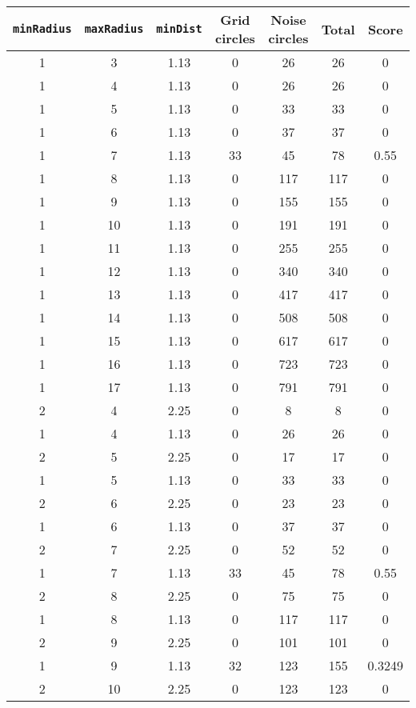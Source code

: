 \documentclass[letterpaper, 12pt]{article}
\begin{document}
\begin{longtable}{|c|c|c|c|c|c|c|}
\hline
\textbf{\texttt{minRadius}} & \textbf{\texttt{maxRadius}} & \textbf{\texttt{minDist}} & \textbf{Grid circles} & \textbf{Noise circles} & \textbf{Total} & \textbf{Score} \\
\hline
1 & 3 & 1.13 & 0 & 26 & 26 & 0 \\
\hline
1 & 4 & 1.13 & 0 & 26 & 26 & 0 \\
\hline
1 & 5 & 1.13 & 0 & 33 & 33 & 0 \\
\hline
1 & 6 & 1.13 & 0 & 37 & 37 & 0 \\
\hline
1 & 7 & 1.13 & 33 & 45 & 78 & 0.55 \\
\hline
1 & 8 & 1.13 & 0 & 117 & 117 & 0 \\
\hline
1 & 9 & 1.13 & 0 & 155 & 155 & 0 \\
\hline
1 & 10 & 1.13 & 0 & 191 & 191 & 0 \\
\hline
1 & 11 & 1.13 & 0 & 255 & 255 & 0 \\
\hline
1 & 12 & 1.13 & 0 & 340 & 340 & 0 \\
\hline
1 & 13 & 1.13 & 0 & 417 & 417 & 0 \\
\hline
1 & 14 & 1.13 & 0 & 508 & 508 & 0 \\
\hline
1 & 15 & 1.13 & 0 & 617 & 617 & 0 \\
\hline
1 & 16 & 1.13 & 0 & 723 & 723 & 0 \\
\hline
1 & 17 & 1.13 & 0 & 791 & 791 & 0 \\
\hline
2 & 4 & 2.25 & 0 & 8 & 8 & 0 \\
\hline
1 & 4 & 1.13 & 0 & 26 & 26 & 0 \\
\hline
2 & 5 & 2.25 & 0 & 17 & 17 & 0 \\
\hline
1 & 5 & 1.13 & 0 & 33 & 33 & 0 \\
\hline
2 & 6 & 2.25 & 0 & 23 & 23 & 0 \\
\hline
1 & 6 & 1.13 & 0 & 37 & 37 & 0 \\
\hline
2 & 7 & 2.25 & 0 & 52 & 52 & 0 \\
\hline
1 & 7 & 1.13 & 33 & 45 & 78 & 0.55 \\
\hline
2 & 8 & 2.25 & 0 & 75 & 75 & 0 \\
\hline
1 & 8 & 1.13 & 0 & 117 & 117 & 0 \\
\hline
2 & 9 & 2.25 & 0 & 101 & 101 & 0 \\
\hline
1 & 9 & 1.13 & 32 & 123 & 155 & 0.3249 \\
\hline
2 & 10 & 2.25 & 0 & 123 & 123 & 0 \\

\end{longtable}
\end{document}
